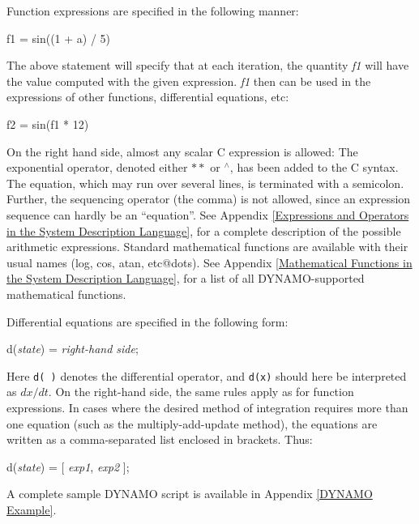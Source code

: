 Function expressions are specified in the following manner:

\begin{example}
        f1 = sin((1 + a) / 5)
\end{example}

The above statement will specify that at each iteration, the quantity \emph{f1} will have the value computed with the given expression. \emph{f1} then can be used in the expressions of other functions, differential equations, etc:

\begin{example}
        f2 = sin(f1 * 12)
\end{example}

On the right hand side, almost any scalar C expression is allowed: The exponential operator, denoted either \emph{$\ast\ast$} or \emph{$^{\wedge}$}, has been added to the C syntax.  The equation, which may run over several lines, is terminated with a semicolon. Further, the sequencing operator (the comma) is not allowed, since an expression sequence can hardly be an ``equation''. See Appendix \ref{Expressions and Operators in the System Description Language}, for a complete description of the possible arithmetic expressions. Standard mathematical functions are available with their usual names (log, cos, atan, etc@dots{}). See Appendix \ref{Mathematical Functions in the System Description Language}, for a list of all DYNAMO-supported mathematical functions. 

Differential equations are specified in the following form:
\begin{example}
        d(\emph{state}) = \emph{right-hand side};
\end{example}
Here \texttt{d( )} denotes the differential operator, and \texttt{d(x)} should here be interpreted as ${dx/dt}$.  On the right-hand side, the same rules apply as for function expressions. In cases where the desired method of integration requires more than one equation (such as the multiply-add-update method), the equations are written as a comma-separated list enclosed in brackets. Thus:
\begin{example}
        d(\emph{state}) = [ \emph{exp1}, \emph{exp2} ];
\end{example}

A complete sample DYNAMO script is available in Appendix \ref{DYNAMO Example}.